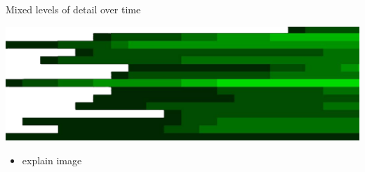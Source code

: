 \begin{Slide}{Mixed levels of detail over time}

\begin{minipage}[t]{1.0\textwidth}
\vspace{-1.0em}\includegraphics[width=1.0\textwidth]{../img/details-time}
\end{minipage}


\begin{itemize}
\item \TODO explain image


\end{itemize}
\end{Slide}